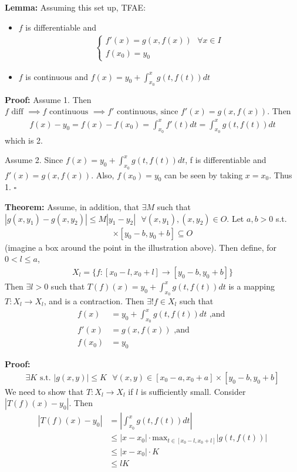 \documentclass{article}
\newcommand*{\qed}{\hfill$\square$}%
\newcommand*{\txt}[1]{\text{ #1 }}%
\newcommand*{\fora}{\txt{}\forall}%
\begin{document}
\textbf{Lemma:} Assuming this set up, TFAE:\begin{itemize}
    \item $f$ is differentiable and \begin{align*}
        \begin{cases}
            f'(x)=g(x,f(x))\fora x\in I \\
            f(x_0)=y_0
        \end{cases}
    \end{align*}
    \item $f$ is continuous and $f(x)=y_0+\int_{x_0}^{x}g(t,f(t))dt$
\end{itemize}

\textbf{Proof:} Assume 1. Then $f\txt{diff}\implies f\txt{continuous}\implies f'\txt{continuous, since}f'(x)=g(x,f(x))$. Then \begin{align*}
    f(x)-y_0=f(x)-f(x_0)=\int_{x_0}^{x}f'(t)dt=\int_{x_0}^{x}g(t,f(t))dt
\end{align*}
which is 2. 

Assume 2. Since $f(x)=y_0+\int_{x_0}^{x}g(t,f(t))dt$, f is differentiable and $f'(x)=g(x,f(x))$. Also, $f(x_0)=y_0$ can be seen by taking $x=x_0$. Thus 1. \qed

\textbf{Theorem:} Assume, in addition, that $\exists M$ such that $|g(x,y_1)-g(x,y_2)|\leq M|y_1-y_2| \fora (x,y_1),(x,y_2)\in O$. Let $a,b>0$ s.t. \begin{align*}
    [x_0-a,x_0+a]\times[y_0-b,y_0+b]\subseteq O
\end{align*}
(imagine a box around the point in the illustration above). Then define, for $0<l\leq a$, \begin{align*}
    X_l=\{f:[x_0-l,x_0+l]\to[y_0-b,y_0+b]\}
\end{align*}
Then $\exists l>0$ such that $T(f)(x)=y_0+\int_{x_0}^{x}g(t,f(t))dt$ is a mapping $T:X_l\to X_l$, and is a contraction. Then $\exists! f\in X_l$ such that \begin{align*}
    f(x)&=y_0+\int_{x_0}^{x}g(t,f(t))dt\txt{,and}\\
    f'(x)&=g(x,f(x))\txt{,and}\\
    f(x_0)&=y_0
\end{align*}

\textbf{Proof:}\begin{align*}
    \exists K\txt{s.t.}|g(x,y)|\leq K\fora (x,y)\in[x_0-a,x_0+a]\times[y_0-b,y_0+b]
\end{align*}
We need to show that $T:X_l\to X_l$ if $l$ is sufficiently small. Consider $|T(f)(x)-y_0|$. Then \begin{align*}
    |T(f)(x)-y_0|&=|\int_{x_0}^{x}g(t,f(t))dt|\\
    &\leq |x-x_0|\cdot\text{max}_{t\in[x_0-l,x_0+l]}|g(t,f(t))|\\
    &\leq |x-x_0|\cdot K\\
    &\leq lK
\end{align*}
\end{document}
